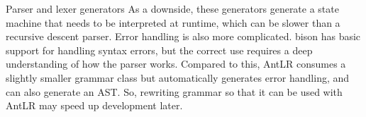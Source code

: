 \begin{myTip}{Parser and lexer generators}
As a downside, these generators generate a state machine that needs to be interpreted at runtime, which can be slower than a recursive descent parser. Error handling is also more complicated. bison has basic support for handling syntax errors, but the correct use requires a deep understanding of how the parser works. Compared to this, AntLR consumes a slightly smaller grammar class but automatically generates error handling, and can also generate an AST. So, rewriting grammar so that it can be used with AntLR may speed up development later.
\end{myTip}
















































